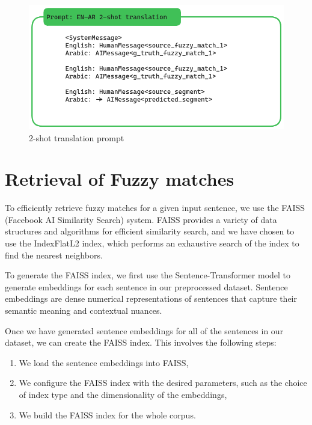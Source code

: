 \documentclass[twocolumn]{article}
\begin{document}
\begin{figure}
\centering
\includegraphics[width=\linewidth, ]{figs/prompt_two_shot_translation} %
\caption{ 2-shot translation prompt}

\label{fig:duck_55}
\end{figure}


\section{Retrieval of Fuzzy matches}
To efficiently retrieve fuzzy matches for a given input sentence, we use the FAISS (Facebook AI Similarity Search) system. FAISS provides a variety of data structures and algorithms for efficient similarity search, and we have chosen to use the IndexFlatL2 index, which performs an exhaustive search of the index to find the nearest neighbors.

To generate the FAISS index, we first use the Sentence-Transformer model to generate embeddings for each sentence in our preprocessed dataset. Sentence embeddings are dense numerical representations of sentences that capture their semantic meaning and contextual nuances.


Once we have generated sentence embeddings for all of the sentences in our dataset, we can create the FAISS index. This involves the following steps:


\begin{enumerate}
\item We load the sentence embeddings into FAISS,


\item We configure the FAISS index with the desired parameters, such as the choice of index type and the dimensionality of the embeddings,


\item We build the FAISS index for the whole corpus.

\end{enumerate}
\end{document}
